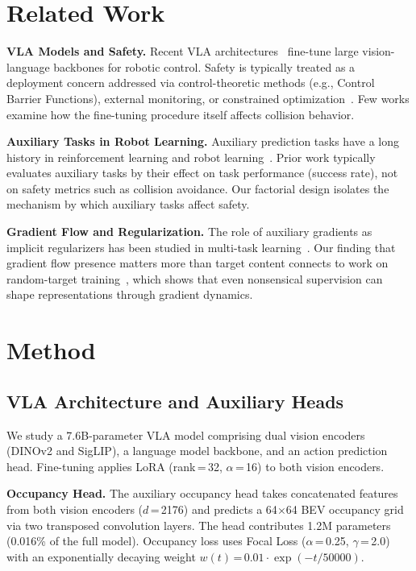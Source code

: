\documentclass[10pt,twocolumn]{article}
\begin{document}
\section{Related Work}

\textbf{VLA Models and Safety.}\quad
Recent VLA architectures~\cite{brohan2023rt2,kim2024openvla} fine-tune large vision-language backbones for robotic control.
Safety is typically treated as a deployment concern addressed via control-theoretic methods (e.g., Control Barrier Functions), external monitoring, or constrained optimization~\cite{zhao2024cbf}.
Few works examine how the fine-tuning procedure itself affects collision behavior.

\textbf{Auxiliary Tasks in Robot Learning.}\quad
Auxiliary prediction tasks have a long history in reinforcement learning and robot learning~\cite{jaderberg2017reinforcement,yarats2021improving}.
Prior work typically evaluates auxiliary tasks by their effect on task performance (success rate), not on safety metrics such as collision avoidance.
Our factorial design isolates the mechanism by which auxiliary tasks affect safety.

\textbf{Gradient Flow and Regularization.}\quad
The role of auxiliary gradients as implicit regularizers has been studied in multi-task learning~\cite{ruder2017overview,standley2020tasks}.
Our finding that gradient flow presence matters more than target content connects to work on random-target training~\cite{maennel2020neural}, which shows that even nonsensical supervision can shape representations through gradient dynamics.

\section{Method}
\label{sec:method}

\subsection{VLA Architecture and Auxiliary Heads}
\label{sec:arch}

We study a 7.6B-parameter VLA model comprising dual vision encoders (DINOv2 and SigLIP), a language model backbone, and an action prediction head.
Fine-tuning applies LoRA (rank\,=\,32, $\alpha$\,=\,16) to both vision encoders.

\textbf{Occupancy Head.}\quad
The auxiliary occupancy head takes concatenated features from both vision encoders ($d$\,=\,2176) and predicts a 64$\times$64 BEV occupancy grid via two transposed convolution layers.
The head contributes 1.2M parameters (0.016\% of the full model).
Occupancy loss uses Focal Loss ($\alpha$\,=\,0.25, $\gamma$\,=\,2.0) with an exponentially decaying weight $w(t)$\,=\,$0.01 \cdot \exp(-t/50000)$.
\end{document}
